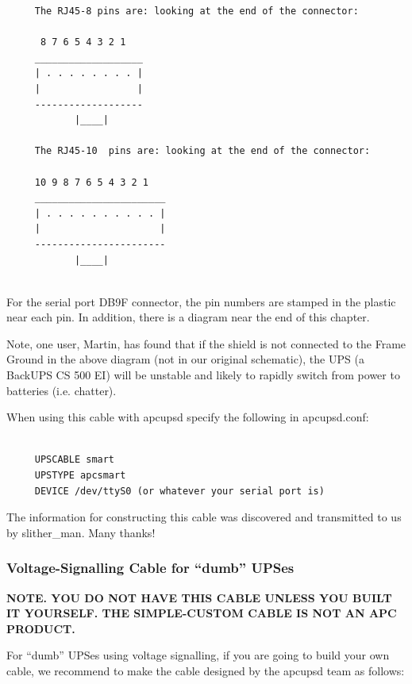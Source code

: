 {{{{{{{{{{\begin{verbatim}
     The RJ45-8 pins are: looking at the end of the connector:
     
      8 7 6 5 4 3 2 1
     ___________________
     | . . . . . . . . |
     |                 |
     -------------------
            |____|
     
     The RJ45-10  pins are: looking at the end of the connector:
     
     10 9 8 7 6 5 4 3 2 1
     _______________________
     | . . . . . . . . . . |
     |                     |
     -----------------------
            |____|
     
\end{verbatim}
\normalsize

For the serial port DB9F connector, the pin numbers are stamped in the plastic
near each pin. In addition, there is a diagram near the end of this chapter.  

Note, one user, Martin, has found that if the shield is not connected to the
Frame Ground in the above diagram (not in our original schematic), the UPS (a
BackUPS CS 500 EI) will be unstable and likely to rapidly switch from power to
batteries (i.e. chatter).  

When using this cable with apcupsd specify the following in apcupsd.conf: 

\footnotesize
\begin{verbatim}
     
     UPSCABLE smart
     UPSTYPE apcsmart
     DEVICE /dev/ttyS0 (or whatever your serial port is)
\end{verbatim}
\normalsize

The information for constructing this cable was discovered and transmitted to
us by slither\_man. Many thanks! 

\label{Voltage_002dSignalling-Cable-for-_0022dumb_0022-UPSes}

\subsubsection*{Voltage-Signalling Cable for ``dumb'' UPSes}

\label{index-Cables_002c-dumb-196}
\label{index-dumb_002c-Cables-197}
{\bf NOTE. YOU DO NOT HAVE THIS CABLE UNLESS YOU BUILT IT YOURSELF.  THE
SIMPLE-CUSTOM CABLE IS NOT AN APC PRODUCT.}  

For ``dumb'' UPSes using voltage signalling, if you are going to build your
own cable, we recommend to make the cable designed by the apcupsd team as
follows: 

}}}}}}}}}}
